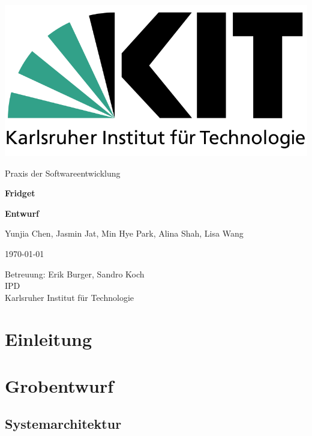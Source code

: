 \documentclass[a4paper]{scrreprt}
\begin{document}
	
	 \begin{flushright}
		\includegraphics[scale = 0.2]{kit-logo.png}\\[0.5cm]
	\end{flushright}
	\vspace*{2cm}

\begin{center} 
	\large Praxis der Softwareentwicklung
	\vspace*{1.5cm}
	
	\textbf{\huge Fridget}
	\vspace*{1cm}
	
	\textbf{\Large Entwurf}
	\vspace*{2cm}
	
	Yunjia Chen, Jasmin Jat, Min Hye Park, Alina Shah, Lisa Wang
	\vspace*{1cm}
	
	\today
	\vspace*{2.5cm}
	
	Betreuung: Erik Burger, Sandro Koch\\[0.5cm]
	IPD\\[0.5cm]
	
	Karlsruher Institut für Technologie
	
\end{center}

\thispagestyle{empty}

\tableofcontents 

\newpage
\chapter{Einleitung}
 

\chapter{Grobentwurf}
	\section{Systemarchitektur}
		
\end{document}
